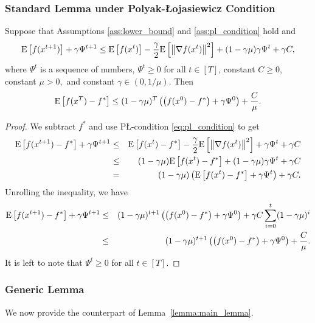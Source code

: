 \documentclass{article}
\begin{document}
\subsubsection{Standard Lemma under Polyak-\L ojasiewicz Condition}

\begin{lemma}
  \label{lemma:good_recursion_pl}
  Suppose that Assumptions \ref{ass:lower_bound} and \ref{ass:pl_condition} hold and
  \begin{align*}
      {\rm E}\left[f(x^{t+1})\right] + \gamma \Psi^{t+1} \leq {\rm E}\left[f(x^t)\right] - \frac{\gamma}{2}{\rm E}\left[\left\| \nabla f(x^t) \right\|^2\right] + (1 - \gamma \mu)\gamma \Psi^{t} + \gamma C,
  \end{align*}
  where $\Psi^{t}$ is a sequence of numbers, $\Psi^{t} \geq 0$ for all $t \in [T]$, constant $C \geq 0,$ constant $\mu > 0,$ and constant $\gamma \in (0, 1 / \mu).$ Then 
  \begin{align}
      \label{eq:good_recursion_pl}
      {\rm E}\left[f(x^{T}) - f^*\right] \leq (1 - \gamma \mu)^{T}\left(\left(f(x^0) - f^*\right) + \gamma \Psi^{0}\right) + \frac{C}{\mu}.
  \end{align}
\end{lemma}

\begin{proof}
  We subtract $f^*$ and use P\L-condition \eqref{eq:pl_condition} to get
  \begin{eqnarray*}
      {\rm E}\left[f(x^{t+1}) - f^*\right] + \gamma \Psi^{t+1} &\leq& {\rm E}\left[f(x^t) - f^*\right] - \frac{\gamma}{2}{\rm E}\left[\left\| \nabla f(x^t) \right\|^2\right] + \gamma \Psi^{t} + \gamma C \\
      &\leq& (1 - \gamma \mu){\rm E}\left[f(x^t) - f^*\right] + (1 - \gamma \mu)\gamma \Psi^{t} + \gamma C \\
      &=& (1 - \gamma \mu)\left({\rm E}\left[f(x^t) - f^*\right] + \gamma \Psi^{t}\right) + \gamma C.
  \end{eqnarray*}
  Unrolling the inequality, we have
  \begin{eqnarray*}
      {\rm E}\left[f(x^{t+1}) - f^*\right] + \gamma \Psi^{t+1} &\leq& (1 - \gamma \mu)^{t+1}\left(\left(f(x^0) - f^*\right) + \gamma \Psi^{0}\right) + \gamma C \sum_{i = 0}^{t} (1 - \gamma \mu)^i \\
      &\leq& (1 - \gamma \mu)^{t+1}\left(\left(f(x^0) - f^*\right) + \gamma \Psi^{0}\right) + \frac{C}{\mu}.
  \end{eqnarray*}
  It is left to note that $\Psi^{t} \geq 0$ for all $t \in [T]$.
\end{proof}

\subsubsection{Generic Lemma}
We now provide the counterpart of Lemma~\ref{lemma:main_lemma}.
\end{document}
